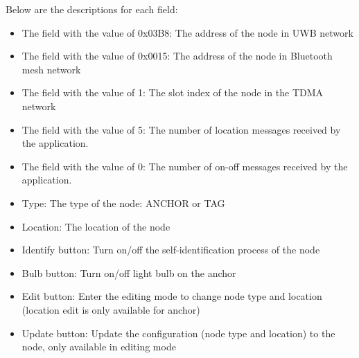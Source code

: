 \documentclass[\main/thesis.tex]{subfiles}
\begin{document}
Below are the descriptions for each field:
\begin{itemize}
    \item The field with the value of 0x03B8: The address of the node in UWB network
    \item The field with the value of 0x0015: The address of the node in Bluetooth mesh network
    \item The field with the value of 1: The slot index of the node in the TDMA network
    \item The field with the value of 5: The number of location messages received by the application.
    \item The field with the value of 0: The number of on-off messages received by the application.
    \item Type: The type of the node: ANCHOR or TAG
    \item Location: The location of the node
    \item Identify button: Turn on/off the self-identification process of the node
    \item Bulb button: Turn on/off light bulb on the anchor
    \item Edit button: Enter the editing mode to change node type and location (location edit is only available for anchor)
    \item Update button: Update the configuration (node type and location) to the node, only available in editing mode
\end{itemize}

\bib
\end{document}
